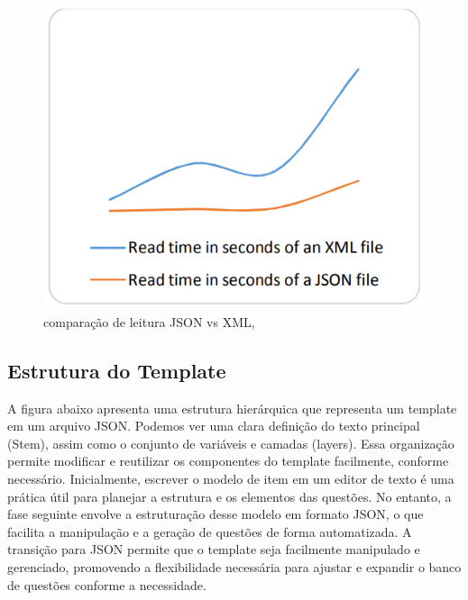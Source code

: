 \begin{figure}[ht]
	\centering
	\includegraphics[width=14cm]{./imagens/capitulo5/json-vs-xml}
	\caption{comparação de leitura JSON vs XML, \parencite{goyal2017} }
	\label{fig:json-vs-xml}
\end{figure}


\subsection{Estrutura do Template}

A figura abaixo apresenta uma estrutura hierárquica que representa um template em um arquivo JSON. Podemos ver uma clara definição do texto principal (Stem), assim como o conjunto de variáveis e camadas (layers). Essa organização permite modificar e reutilizar os componentes do template facilmente, conforme necessário. Inicialmente, escrever o modelo de item em um editor de texto é uma prática útil para planejar a estrutura e os elementos das questões. No entanto, a fase seguinte envolve a estruturação desse modelo em formato JSON, o que facilita a manipulação e a geração de questões de forma automatizada. A transição para JSON permite que o template seja facilmente manipulado e gerenciado, promovendo a flexibilidade necessária para ajustar e expandir o banco de questões conforme a necessidade.


